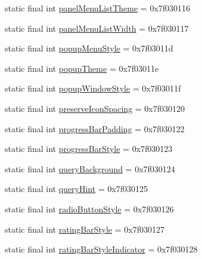\begin{DoxyCompactItemize}
\item 
static final int \mbox{\hyperlink{classandroid_1_1support_1_1v7_1_1appcompat_1_1R_1_1attr_a2135b6ddda76698d615eb70b7dfd947a}{panel\+Menu\+List\+Theme}} = 0x7f030116
\item 
static final int \mbox{\hyperlink{classandroid_1_1support_1_1v7_1_1appcompat_1_1R_1_1attr_a9147d08a5e9a83452728a0a6ba43c322}{panel\+Menu\+List\+Width}} = 0x7f030117
\item 
static final int \mbox{\hyperlink{classandroid_1_1support_1_1v7_1_1appcompat_1_1R_1_1attr_ab0fa39a065771ab5b0b3c67ad7669ec8}{popup\+Menu\+Style}} = 0x7f03011d
\item 
static final int \mbox{\hyperlink{classandroid_1_1support_1_1v7_1_1appcompat_1_1R_1_1attr_a53a96f272af2cd7a490b413bed6194d5}{popup\+Theme}} = 0x7f03011e
\item 
static final int \mbox{\hyperlink{classandroid_1_1support_1_1v7_1_1appcompat_1_1R_1_1attr_ae526bade263bb7b3955a2ba8c5a3b291}{popup\+Window\+Style}} = 0x7f03011f
\item 
static final int \mbox{\hyperlink{classandroid_1_1support_1_1v7_1_1appcompat_1_1R_1_1attr_a23842b8bdb2e8d795c6913555589c080}{preserve\+Icon\+Spacing}} = 0x7f030120
\item 
static final int \mbox{\hyperlink{classandroid_1_1support_1_1v7_1_1appcompat_1_1R_1_1attr_afa063791ac3308b6c783d8da10cb5657}{progress\+Bar\+Padding}} = 0x7f030122
\item 
static final int \mbox{\hyperlink{classandroid_1_1support_1_1v7_1_1appcompat_1_1R_1_1attr_a15645d01d21d7ada36d318d727ad9a55}{progress\+Bar\+Style}} = 0x7f030123
\item 
static final int \mbox{\hyperlink{classandroid_1_1support_1_1v7_1_1appcompat_1_1R_1_1attr_ac8240dbb56e99878ab137f9e9d114dc0}{query\+Background}} = 0x7f030124
\item 
static final int \mbox{\hyperlink{classandroid_1_1support_1_1v7_1_1appcompat_1_1R_1_1attr_a5bd83d9a31d5db6c3ee6efe7f860f06f}{query\+Hint}} = 0x7f030125
\item 
static final int \mbox{\hyperlink{classandroid_1_1support_1_1v7_1_1appcompat_1_1R_1_1attr_a201b7913a0de817ec30acd0691d2625e}{radio\+Button\+Style}} = 0x7f030126
\item 
static final int \mbox{\hyperlink{classandroid_1_1support_1_1v7_1_1appcompat_1_1R_1_1attr_ab991f58e144af354b99b3106d5d02d7d}{rating\+Bar\+Style}} = 0x7f030127
\item 
static final int \mbox{\hyperlink{classandroid_1_1support_1_1v7_1_1appcompat_1_1R_1_1attr_a9b2194c743548e70f1332da882b63b6f}{rating\+Bar\+Style\+Indicator}} = 0x7f030128

\end{DoxyCompactItemize}
